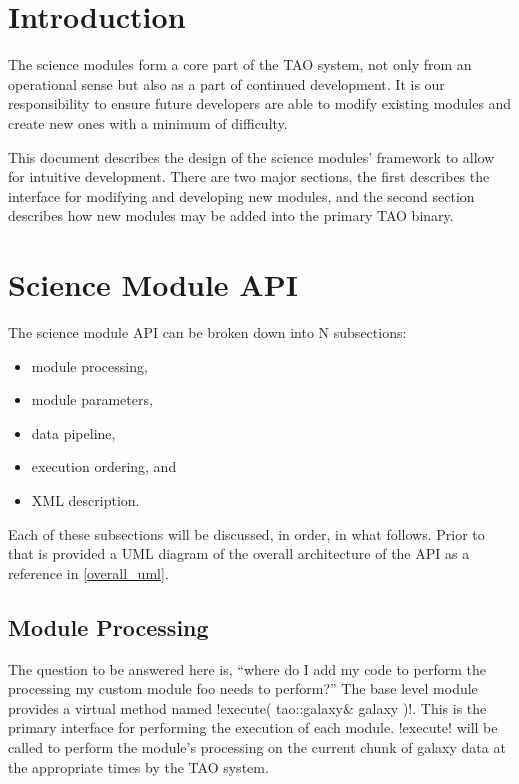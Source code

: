 \documentclass[14pt]{article}
\begin{document}
\maketitle

\section{Introduction}

The science modules form a core part of the TAO system, not only from
an operational sense but also as a part of continued development. It
is our responsibility to ensure future developers are able to
modify existing modules and create new ones with a minimum of
difficulty.

This document describes the design of the science modules'
framework to allow for intuitive development. There are two major
sections, the first describes the interface for modifying and
developing new modules, and the second section describes how
new modules may be added into the primary TAO binary.

\section{Science Module API}

The science module API can be broken down into N subsections:
\begin{itemize}
  \item module processing,
  \item module parameters,
  \item data pipeline,
  \item execution ordering, and
  \item XML description.
\end{itemize}
Each of these subsections will be discussed, in order, in what follows.
Prior to that is provided a UML diagram of the overall architecture
of the API as a reference in \ref{overall_uml}.

\subsection{Module Processing}

The question to be answered here is, ``where do I add my code to perform
the processing my custom module foo needs to perform?'' The base level
module provides a virtual method named \lstverb!execute( tao::galaxy& galaxy )!.
This is the primary interface for performing the execution of each module.
\lstverb!execute! will be called to perform the module's processing on
the current chunk of galaxy data at the appropriate times by the TAO
system.
\end{document}
